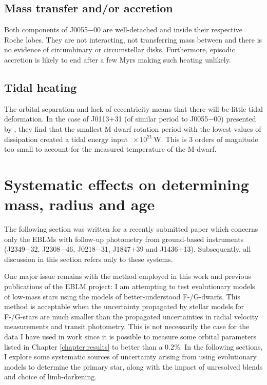 \subsection{Mass transfer and/or accretion}

Both components of J0055$-$00 are well-detached and inside their respective Roche lobes. They are not interacting, not transferring mass between and there is no evidence of circumbinary or circumstellar disks. Furthermore,  episodic accretion is likely to end after a few Myrs \citep{2009ApJ...702L..27B} making such heating unlikely. 

\subsection{Tidal heating}

The orbital separation and lack of eccentricity means that there will be little tidal deformation. In the case of J0113$+$31 (of similar period to J0055$-$00) presented by \citet{2014A&A...572A..50G}, they find that the smallest M-dwarf rotation period with the lowest values of dissipation created a tidal energy input $~ \times 10^{21}$\,W. This is 3 orders of magnitude too small to account for the measured temperature of the M-dwarf. 





%
%

\section{Systematic effects  on determining mass, radius and age}\label{discuss:uncertainties}

The following section was written for a recently submitted paper which concerns only the EBLMs with follow-up photometry from ground-based instruments (J2349$-$32, J2308$-$46, J0218$-$31, J1847$+$39 and J1436$+$13). Subsequently, all discussion in this section refers only to these systems.

One major issue remains with the method employed in this work and previous publications of the EBLM project: I am attempting to test evolutionary models of low-mass stars using the models of better-understood F-/G-dwarfs. This method is acceptable when the uncertainty propagated by stellar models for F-/G-stars are much smaller than the propagated uncertainties in radial velocity measurements and transit photometry. This is not necessarily the case for the data I have used in work since it is possible to measure some orbital parameters listed in Chapter \ref{chapter:results} to better than a 0.2\%. In the following sections, I explore some systematic sources of uncertainty arising from using evolutionary models to determine the primary star, along with the impact of unresolved blends and choice of limb-darkening. 



